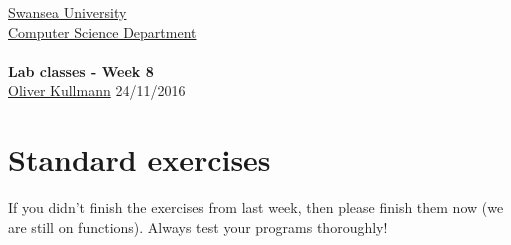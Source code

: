 \documentclass[11pt]{article}
\newcommand{\Java}{\lstset{language=Java,keywordstyle=\bfseries,breaklines,breakindent=30pt}}
\begin{document}
\begin{center}
  \href{http://www.swan.ac.uk/}{Swansea University}\\
  \href{http://www.swan.ac.uk/compsci/}{Computer Science Department}\\[1ex]
  \href{\chp}{\module}\\[1ex]
  \textbf{Lab classes - Week 8}\\
  \href{http://cs.swan.ac.uk/~csoliver}{Oliver Kullmann} 24/11/2016
\end{center}


\section{Standard exercises}
\label{sec:stdex}

\Java

If you didn't finish the exercises from last week, then please finish them now (we are still on functions). Always test your programs thoroughly!
\end{document}
